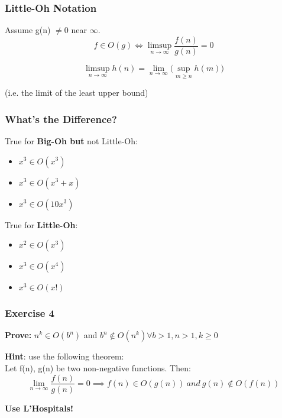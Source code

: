 \documentclass{beamer}
\begin{document}
\begin{frame}
\frametitle{Little-Oh Notation}

Assume g(n) $\neq$0 near $\infty$. 
$$f \in O(g) \iff   \limsup\limits_{n\rightarrow \infty} \frac{f(n)}{g(n)} = 0 $$ 

$$\limsup\limits_{n\rightarrow \infty} h(n) = \lim\limits_{n \to \infty} \Big (\sup_{m\geq n} h(m) \Big)$$ 

  (i.e. the limit of the least upper bound) 
\end{frame}

\begin{frame}
\frametitle{What's the Difference?}
{\color{green}True} for \textbf{Big-Oh but} \alert{not Little-Oh}:\\
\begin{itemize} 
\item $x^{3} \in O(x^{3})$ 
\item $x^{3} \in O(x^{3}+x)$ 
\item $x^{3} \in O(10x^{3})$ 
\end{itemize} 

{\color{green}True} for \textbf{Little-Oh}:
\begin{itemize} 
\item $x^{2} \in O(x^{3})$ 
\item $x^{3} \in O(x^{4})$ 
\item $x^{3} \in O(x!)$ 
\end{itemize} 
\end{frame}

 

\begin{frame} 
\frametitle{Exercise 4}
\textbf{Prove:} $n^{k} \in O(b^{n})$ and $b^{n} 	\notin O(n^{k}) \forall b> 1, n>1, k\geq 0$ \\
 \begin{center}
{\color{blue} \textbf{Hint}: use the following theorem: \\

Let f(n), g(n) be two non-negative functions. Then: $$\lim_{n \to \infty} \frac{f(n)}{g(n)} = 0 \implies f (n) \in O(g(n)) \ and \ g(n) 	\notin O(f(n))$$ }

\end{center}
\textbf{Use L'Hospitals! }


\end{frame}
\end{document}
